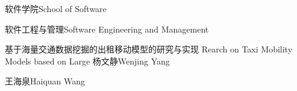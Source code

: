 
\school
{软件学院}{School of Software}

\major
{软件工程与管理}{Software Engineering and Management}

\thesistitle
{基于海量交通数据挖掘的出租移动模型的研究与实现}
{ }
{Rearch on Taxi Mobility Models based on Large }
{ }
\thesisauthor
{杨文静}{Wenjing Yang}

\teacher
{王海泉}{Haiquan Wang}






